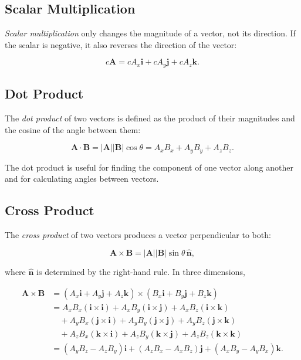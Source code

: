 \documentclass[12pt]{article}
\begin{document}
\subsection{Scalar Multiplication}

\emph{Scalar multiplication} only changes the magnitude of a vector, not its direction. If the scalar is negative, it also reverses the direction of the vector:

\[
c\mathbf{A} = cA_x\mathbf{i} + cA_y\mathbf{j} + cA_z\mathbf{k}.
\]

\subsection{Dot Product}

The \emph{dot product} of two vectors is defined as the product of their magnitudes and the cosine of the angle between them:

\[
\mathbf{A}\cdot\mathbf{B}
= |\mathbf{A}||\mathbf{B}|\cos\theta
= A_xB_x + A_yB_y + A_zB_z.
\]

The dot product is useful for finding the component of one vector along another and for calculating angles between vectors.

\subsection{Cross Product}

The \emph{cross product} of two vectors produces a vector perpendicular to both:

\[
\mathbf{A}\times\mathbf{B}
= |\mathbf{A}||\mathbf{B}|\sin\theta\,\hat{\mathbf{n}},
\]

where $\hat{\mathbf{n}}$ is determined by the right-hand rule. In three dimensions,

\begin{align*}
\mathbf{A}\times\mathbf{B}
&= (A_x\mathbf{i} + A_y\mathbf{j} + A_z\mathbf{k}) \times (B_x\mathbf{i} + B_y\mathbf{j} + B_z\mathbf{k})\\
&= A_xB_x(\mathbf{i}\times\mathbf{i}) + A_xB_y(\mathbf{i}\times\mathbf{j}) + A_xB_z(\mathbf{i}\times\mathbf{k}) \\
&\quad + A_yB_x(\mathbf{j}\times\mathbf{i}) + A_yB_y(\mathbf{j}\times\mathbf{j}) + A_yB_z(\mathbf{j}\times\mathbf{k}) \\
&\quad + A_zB_x(\mathbf{k}\times\mathbf{i}) + A_zB_y(\mathbf{k}\times\mathbf{j}) + A_zB_z(\mathbf{k}\times\mathbf{k}) \\
&= (A_yB_z - A_zB_y)\mathbf{i} + (A_zB_x - A_xB_z)\mathbf{j} + (A_xB_y - A_yB_x)\mathbf{k}.  
\end{align*}
\end{document}
